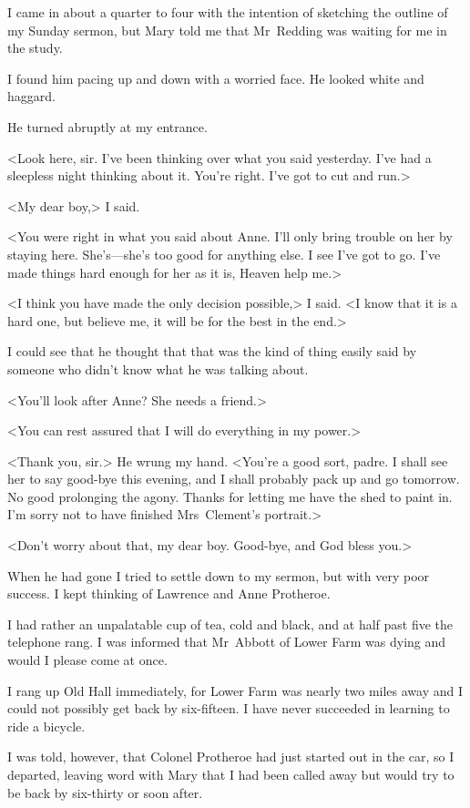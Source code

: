 I came in about a quarter to four with the intention of sketching the outline of my Sunday sermon, but Mary told me that Mr~Redding was waiting for me in the study.

I found him pacing up and down with a worried face. He looked white and haggard.

He turned abruptly at my entrance.

<Look here, sir. I've been thinking over what you said yesterday. I've had a sleepless night thinking about it. You're right. I've got to cut and run.>

<My dear boy,> I said.

<You were right in what you said about Anne. I'll only bring trouble on her by staying here. She's—she's too good for anything else. I see I've got to go. I've made things hard enough for her as it is, Heaven help me.>

<I think you have made the only decision possible,> I said. <I know that it is a hard one, but believe me, it will be for the best in the end.>

I could see that he thought that that was the kind of thing easily said by someone who didn't know what he was talking about.

<You'll look after Anne? She needs a friend.>

<You can rest assured that I will do everything in my power.>

<Thank you, sir.> He wrung my hand. <You're a good sort, padre. I shall see her to say good-bye this evening, and I shall probably pack up and go tomorrow. No good prolonging the agony. Thanks for letting me have the shed to paint in. I'm sorry not to have finished Mrs~Clement's portrait.>

<Don't worry about that, my dear boy. Good-bye, and God bless you.>

When he had gone I tried to settle down to my sermon, but with very poor success. I kept thinking of Lawrence and Anne Protheroe.

I had rather an unpalatable cup of tea, cold and black, and at half past five the telephone rang. I was informed that Mr~Abbott of Lower Farm was dying and would I please come at once.

I rang up Old Hall immediately, for Lower Farm was nearly two miles away and I could not possibly get back by six-fifteen. I have never succeeded in learning to ride a bicycle.

I was told, however, that Colonel Protheroe had just started out in the car, so I departed, leaving word with Mary that I had been called away but would try to be back by six-thirty or soon after.